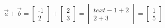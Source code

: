 \documentclass[preview]{standalone}
\begin{document}
\begin{align*}
\vec{a} + \vec{b} = \begin{bmatrix} \text{-}1 \\ 2 \end{bmatrix} + \begin{bmatrix} 2 \\ 3 \end{bmatrix} = \begin{bmatrix} text{-}1 + 2 \\ 2 + 3 \end{bmatrix} = \begin{bmatrix} 1 \\ 5 \end{bmatrix}
\end{align*}
\end{document}
